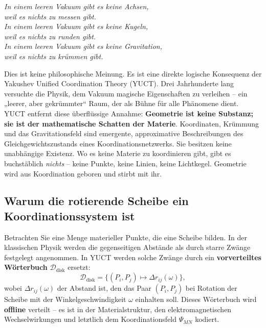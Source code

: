 \documentclass[12pt,a4paper]{article}
\begin{document}
	\begin{tcolorbox}[
		title={\bfseries Eine logisch elementare Aussage},
		colback=blue!3!white,
		colframe=blue!50!black,
		fonttitle=\bfseries,
		sharp corners
		]
		\small
		\textit{In einem leeren Vakuum gibt es keine Achsen,\\
			weil es nichts zu messen gibt.\\
			In einem leeren Vakuum gibt es keine Kugeln,\\
			weil es nichts zu runden gibt.\\
			In einem leeren Vakuum gibt es keine Gravitation,\\
			weil es nichts zu krümmen gibt.}
		
		\medskip
		Dies ist keine philosophische Meinung. Es ist eine direkte logische Konsequenz der Yakushev
		Unified Coordination Theory (YUCT). Drei Jahrhunderte lang versuchte die Physik, dem Vakuum
		magische Eigenschaften zu verleihen – ein „leerer, aber gekrümmter“ Raum, der als Bühne für alle
		Phänomene dient. YUCT entfernt diese überflüssige Annahme: \textbf{Geometrie ist keine Substanz;
			sie ist der mathematische Schatten der Materie}. Koordinaten, Krümmung und das Gravitationsfeld
		sind emergente, approximative Beschreibungen des Gleichgewichtszustands eines Koordinationsnetzwerks.
		Sie besitzen keine unabhängige Existenz. Wo es keine Materie zu koordinieren gibt, gibt es buchstäblich
		\textit{nichts} – keine Punkte, keine Linien, keine Lichtkegel. Geometrie wird aus Koordination geboren
		und stirbt mit ihr.
	\end{tcolorbox}
	
	\subsection{Warum die rotierende Scheibe ein Koordinationssystem ist}
	\label{subsec:disk-coordination}
	
	Betrachten Sie eine Menge materieller Punkte, die eine Scheibe bilden. In der klassischen Physik werden die gegenseitigen Abstände als durch starre Zwänge festgelegt angenommen. In YUCT werden solche Zwänge durch ein \textbf{vorverteiltes Wörterbuch} \(\mathcal{D}_{\text{disk}}\) ersetzt:
	\[
	\mathcal{D}_{\text{disk}} = \bigl\{ (P_i, P_j) \mapsto \Delta r_{ij}(\omega) \bigr\},
	\]
	wobei \(\Delta r_{ij}(\omega)\) der Abstand ist, den das Paar \((P_i,P_j)\) bei Rotation der Scheibe mit der Winkelgeschwindigkeit \(\omega\) einhalten soll. Dieses Wörterbuch wird \textbf{offline} verteilt – es ist in der Materialstruktur, den elektromagnetischen Wechselwirkungen und letztlich dem Koordinationsfeld \(\Psi_{MN}\) kodiert.
	
\end{document}
